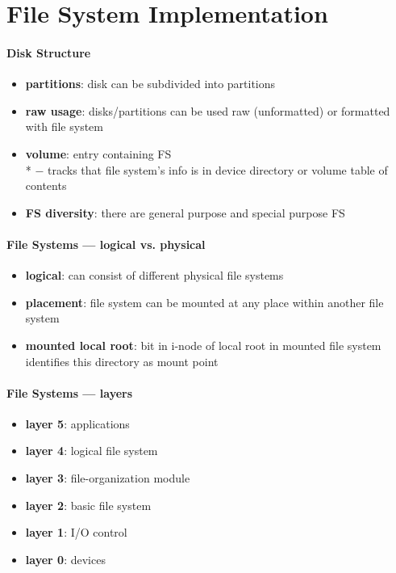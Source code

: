 \section{File System Implementation}

\paragraph{Disk Structure}
\begin{itemize}
  \item \textbf{partitions}: disk can be subdivided into partitions
  \item \textbf{raw usage}: disks/partitions can be used raw (unformatted) or formatted with file system
  \item \textbf{volume}: entry containing FS \\*
    $ - $ tracks that file system's info is in device directory or volume table of contents
  \item \textbf{FS diversity}: there are general purpose and special purpose FS
\end{itemize}

\paragraph{File Systems --- logical vs. physical}
\begin{itemize}
  \item \textbf{logical}: can consist of different physical file systems
  \item \textbf{placement}: file system can be mounted at any place within another file system
  \item \textbf{mounted local root}: bit in i-node of local root in mounted file system identifies this directory as mount point
\end{itemize}

\paragraph{File Systems --- layers}
\begin{itemize}
  \item \textbf{layer 5}: applications
  \item \textbf{layer 4}: logical file system
  \item \textbf{layer 3}: file-organization module
  \item \textbf{layer 2}: basic file system
  \item \textbf{layer 1}: I/O control
  \item \textbf{layer 0}: devices
\end{itemize}

